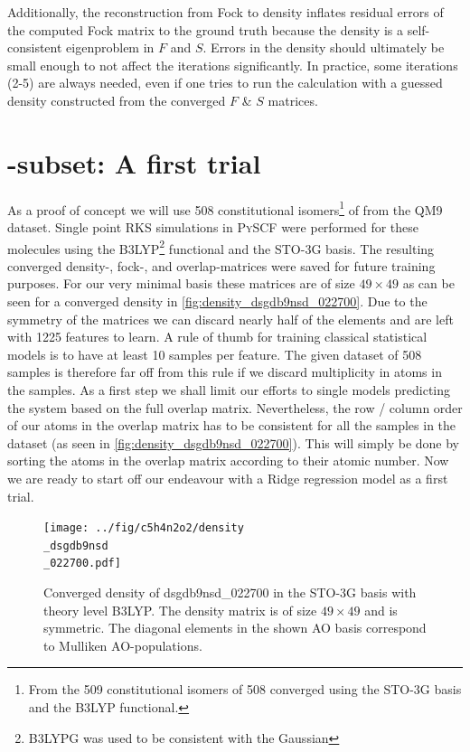 Additionally, the reconstruction from Fock to density inflates residual errors of the computed Fock matrix to the ground truth because the density is a self-consistent eigenproblem in $F$ and $S$. Errors in the density should ultimately be small enough to not affect the iterations significantly. In practice, some iterations (2-5) are always needed, even if one tries to run the calculation with a guessed density constructed from the converged $F$ \& $S$ matrices.\\

\section{-subset: A first trial}
\label{sec:qm9_c5h4n2o2}

As a proof of concept we will use 508 constitutional isomers\footnote{From the 509 constitutional isomers of  508 converged using the STO-3G basis and the B3LYP functional.} of  from the QM9 dataset. 
Single point RKS simulations in \textsc{PySCF} \parencite{ref:pyscf} were performed for these molecules using the B3LYP\footnote{B3LYPG was used to be consistent with the Gaussian} functional and the STO-3G basis. The resulting converged density-, fock-, and overlap-matrices were saved for future training purposes. For our very minimal basis these matrices are of size $49 \times 49$ as can be seen for a converged density in \autoref{fig:density_dsgdb9nsd_022700}. 
Due to the symmetry of the matrices we can discard nearly half of the elements and are left with 1225 features to learn. A rule of thumb for training classical statistical models is to have at least 10 samples per feature. \parencite{ref:rule_of_10} The given dataset of 508 samples is therefore far off from this rule if we discard multiplicity in atoms in the samples. As a first step we shall limit our efforts to single models predicting the system based on the full overlap matrix. Nevertheless, the row / column order of our atoms in the overlap matrix has to be consistent for all the samples in the dataset (as seen in \autoref{fig:density_dsgdb9nsd_022700}). This will simply be done by sorting the atoms in the overlap matrix according to their atomic number. Now we are ready to start off our endeavour with a Ridge regression model as a first trial. 

\begin{figure}[H]
    \centering
    \texttt{[image: ../fig/c5h4n2o2/density\\\_dsgdb9nsd\\\_022700.pdf]}
    \caption[Density matrix of dsgdb9nsd\_022700 in the STO-3G basis with theory level B3LYP]{Converged density of dsgdb9nsd\_022700 in the STO-3G basis with theory level B3LYP. The density matrix is of size $49 \times 49$ and is symmetric. The diagonal elements in the shown AO basis correspond to Mulliken AO-populations. }
    \label{fig:density_dsgdb9nsd_022700}
\end{figure}


